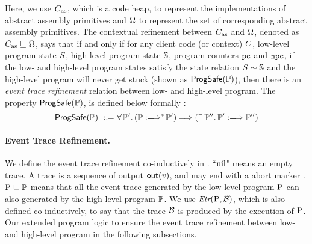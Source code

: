 Here, we use $C_{\text{as}}$, which is a code heap, 
to represent the implementations of abstract 
assembly primitives and $\Omega$ to represent the set of corresponding 
abstract assembly primitives. The contextual refinement between 
$C_{\text{as}}$ and $\Omega$, denoted as $C_{\text{as}} \sqsubseteq \Omega$, 
says that if and only if for any client code 
(or context) $C$, low-level program 
state $S$, high-level program state $\mathbb{S}$, program counters 
$\texttt{pc}$ and $\texttt{npc}$, if the low- and high-level program states satisfy the 
state relation ${S} \sim {\mathbb{S}}$ and the high-level program 
will never get stuck (shown as $\textsf{ProgSafe}(\mathbb{P})$), 
then there is an {\it event trace refinement} relation 
between low- and high-level program. The property $\textsf{ProgSafe}(\mathbb{P})$, 
is defined below formally : 
\[
    \progsafe(\HProg) \ \define \ 
    \forall \, \HProg'. \, 
    (\HGlobMultiTrans{\HProg}{}{*}{\HProg'}) 
    \Longrightarrow 
    (\exists \, \HProg''. \, 
        \HGlobTrans{\HProg'}{}{\HProg''})
\]

\paragraph{\textbf{Event Trace Refinement.}}
We define the event trace refinement co-inductively 
in \Fig{\ref{fig:event-trace-refinement}}. ``$\text{nil}$" means 
an empty trace. A trace is a sequence of output $\textsf{out}({v})$, 
and may end with a abort marker \evtabort{}. 
$\text{P} \sqsubseteq \mathbb{P}$ means that all the event trace 
generated by the low-level program $\text{P}$ can also 
generated by the high-level program $\mathbb{P}$. 
We use $\textit{Etr}{(\text{P}, \mathcal{B})}$, which is also defined 
co-inductively, to say that the trace 
$\mathcal{B}$ is produced by the execution of $\text{P}$. 
Our extended program logic to ensure 
the event trace refinement between low- and high-level 
program in the following subsections. 

